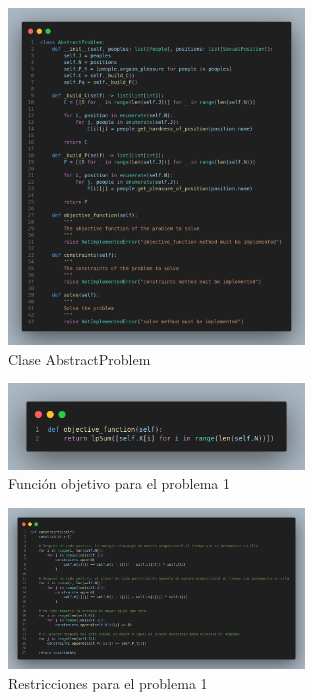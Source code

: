 \documentclass[12pt]{article}
\begin{document}
\begin{figure}
    \centering
    \includegraphics[width=0.7\textwidth]{images/abstract.png}
    \caption{Clase AbstractProblem}
    \label{fig:abstract}
\end{figure}

\begin{figure}
    \centering
    \includegraphics[width=0.7\textwidth]{images/max_objetive.png}
    \caption{Función objetivo para el problema 1}
    \label{fig:fop1}
\end{figure}

\begin{figure}
    \centering
    \includegraphics[width=0.7\textwidth]{images/max_constraints.png}
    \caption{Restricciones para el problema 1}
    \label{fig:rp1}
\end{figure}
\end{document}
